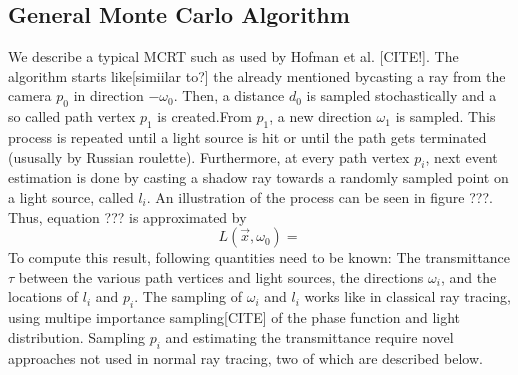 \subsection{General Monte Carlo Algorithm}
We describe a typical MCRT such as used by Hofman et al. [CITE!].
The algorithm starts like[simiilar to?] the already mentioned bycasting a ray from the camera $p_0$ in direction $-\omega_0$. Then, a distance $d_0$ is sampled stochastically and a so called path vertex $p_1$ is created.From $p_1$, a new direction $\omega_1$ is sampled. This process is repeated until a light source is hit or until the path gets terminated (ususally by Russian roulette). Furthermore, at every path vertex $p_i$, next event estimation is done by casting a shadow ray towards a randomly sampled point on a light source, called $l_i$.
An illustration of the process can be seen in figure ???.
Thus, equation ??? is approximated by
\begin{equation}
L(\vec{x},\omega_0) = 
\end{equation}
To compute this result, following quantities need to be known: The transmittance $\tau$ between the various path vertices and light sources, the directions $\omega_i$, and the locations of $l_i$ and $p_i$.
The sampling of $\omega_i$ and $l_i$ works like in classical ray tracing, using multipe importance sampling[CITE] of the phase function and light distribution. Sampling $p_i$ and estimating the transmittance require novel approaches not used in normal ray tracing, two of which are described below. 

